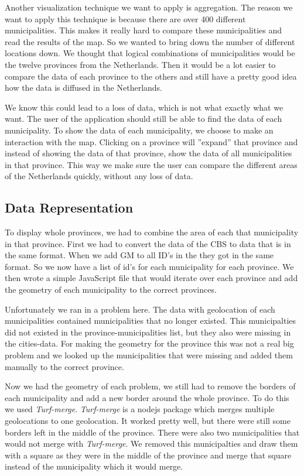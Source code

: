		Another visualization technique we want to apply is aggregation.
		The reason we want to apply this technique is because there are over 400 different municipalities.
		This makes it really hard to compare these municipalities and read the results of the map.
		So we wanted to bring down the number of different locations down.
		We thought that logical combinations of municipalities would be the twelve provinces from the Netherlands.
		Then it would be a lot easier to compare the data of each province to the others and still have a pretty good idea how the data is diffused in the Netherlands.

		We know this could lead to a loss of data, which is not what exactly what we want.
		The user of the application should still be able to find the data of each municipality.
		To show the data of each municipality, we choose to make an interaction with the map.
		Clicking on a province will ''expand'' that province and instead of showing the data of that province, show the data of all municipalities in that province.
		This way we make sure the user can compare the different areas of the Netherlands quickly, without any loss of data.

	\subsection{Data Representation}
		To display whole provinces, we had to combine the area of each that municipality in that province.
		First we had to convert the data of the CBS to data that is in the same format.
		When we add GM to all ID's in the they got in the same format.
		So we now have a list of id's for each municipality for each province.
		We then wrote a simple JavaScript file that would iterate over each province and add the geometry of each municipality to the correct provinces.

		Unfortunately we ran in a problem here.
		The data with geolocation of each municipalities contained municipalities that no longer existed.
		This municipalties did not existed in the province-municipalities list, but they also were missing in the cities-data.
		For making the geometry for the province this was not a real big problem and we looked up the municipalities that were missing and added them manually to the correct province.

		Now we had the geometry of each problem, we still had to remove the borders of each municipality and add a new border around the whole province.
		To do this we used \emph{Turf-merge}.
		\emph{Turf-merge} is a nodejs package which merges multiple geolocations to one geolocation.
		It worked pretty well, but there were still some borders left in the middle of the province.
		There were also two municipalities that would not merge with \emph{Turf-merge}.
		We removed this municipalties and draw them with a square as they were in the middle of the province and merge that square instead of the municipality which it would merge.

